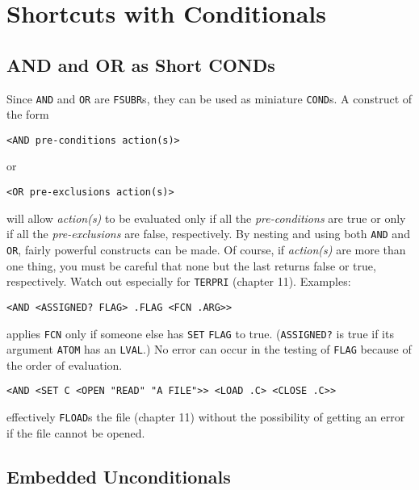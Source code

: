 \documentclass[a4paper]{scrbook}
\begin{document}
\section{Shortcuts with Conditionals}\label{shortcuts-with-conditionals}

\subsection{AND and OR as Short CONDs}\label{and-and-or-as-short-conds}

Since \texttt{AND}  and \texttt{OR} are \texttt{FSUBR}s, they can be used as
miniature \texttt{COND}s. A construct of the form

\begin{verbatim}
<AND pre-conditions action(s)>
\end{verbatim}

or

\begin{verbatim}
<OR pre-exclusions action(s)>
\end{verbatim}

will allow \emph{action(s)} to be evaluated only if all the \emph{pre-conditions} are true or only if all the
\emph{pre-exclusions} are false, respectively. By nesting and using both \texttt{AND} and \texttt{OR}, fairly powerful
constructs can be made. Of course, if \emph{action(s)} are more than one thing, you must be careful that none but the last
returns false or true, respectively. Watch out especially for \texttt{TERPRI} (chapter 11).
Examples:

\begin{verbatim}
<AND <ASSIGNED? FLAG> .FLAG <FCN .ARG>>
\end{verbatim}

 applies \texttt{FCN} only if someone else has \texttt{SET} \texttt{FLAG} to true.
(\texttt{ASSIGNED?} is true if its argument \texttt{ATOM} has an \texttt{LVAL}.) No error can occur in the testing of
\texttt{FLAG} because of the order of evaluation.

\begin{verbatim}
<AND <SET C <OPEN "READ" "A FILE">> <LOAD .C> <CLOSE .C>>
\end{verbatim}

effectively \texttt{FLOAD}s the file (chapter 11) without the possibility of getting an error if the
file cannot be opened.

\subsection{Embedded Unconditionals}\label{embedded-unconditionals}
\end{document}
